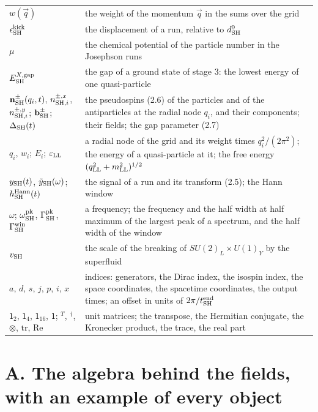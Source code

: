 \documentclass[
  10pt,
]{article}
\begin{document}
\begin{longtable}[]{@{}
  >{\raggedright\arraybackslash}p{}
  >{\raggedright\arraybackslash}p{}@{}}
\(w(\vec q)\) & the weight of the momentum \(\vec q\) in the sums over
the grid \\
\(\epsilon^{\rm kick}_{\rm SH}\) & the displacement of a run, relative
to \(d^0_{\rm SH}\) \\
\(\mu\) & the chemical potential of the particle number in the Josephson
runs \\
\(E^{X,{\rm gap}}_{\rm SH}\) & the gap of a ground state of stage 3: the
lowest energy of one quasi-particle \\
\(\mathbf n^\pm_{\rm SH}(q_i,t)\), \(n^{\pm,x}_{{\rm SH},i}\),
\(n^{\pm,y}_{{\rm SH},i}\); \(\mathbf b^\pm_{\rm SH}\);
\(\Delta_{\rm SH}(t)\) & the pseudospins (2.6) of the particles and of
the antiparticles at the radial node \(q_i\), and their components;
their fields; the gap parameter (2.7) \\
\(q_i\), \(w_i\); \(E_i\); \(\varepsilon_{\rm LL}\) & a radial node of
the grid and its weight times \(q_i^2/(2\pi^2)\); the energy of a
quasi-particle at it; the free energy
\((q_{\rm LL}^2+m_{\rm LL}^2)^{1/2}\) \\
\(y_{\rm SH}(t)\), \(\tilde y_{\rm SH}(\omega)\);
\(h^{\rm Hann}_{\rm SH}(t)\) & the signal of a run and its transform
(2.5); the Hann window \\
\(\omega\); \(\omega^{\rm pk}_{\rm SH}\), \(\Gamma^{\rm pk}_{\rm SH}\),
\(\Gamma^{\rm win}_{\rm SH}\) & a frequency; the frequency and the half
width at half maximum of the largest peak of a spectrum, and the half
width of the window \\
\(v_{\rm SH}\) & the scale of the breaking of \(SU(2)_L\times U(1)_Y\)
by the superfluid \\
\(a\), \(d\), \(s\), \(j\), \(p\), \(i\), \(x\) & indices: generators,
the Dirac index, the isospin index, the space coordinates, the spacetime
coordinates, the output times; an offset in units of
\(2\pi/t^{\rm end}_{\rm SH}\) \\
\(\mathsf 1_2\), \(\mathsf 1_4\), \(\mathsf 1_{16}\), \(\mathsf 1\);
\({}^T\), \({}^\dagger\), \(\otimes\), \(\mathrm{tr}\), \(\mathrm{Re}\)
& unit matrices; the transpose, the Hermitian conjugate, the Kronecker
product, the trace, the real part \\
\end{longtable}

\hypertarget{a.-the-algebra-behind-the-fields-with-an-example-of-every-object}{%
\section{A. The algebra behind the fields, with an example of every
object}\label{a.-the-algebra-behind-the-fields-with-an-example-of-every-object}}
\end{document}
